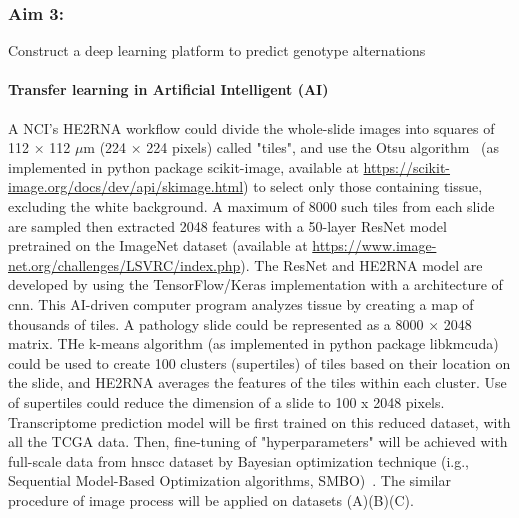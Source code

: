 \documentclass[12pt, a4paper]{article}
\begin{document}
\subsubsection*{Aim 3:} Construct a deep learning platform to predict genotype alternations \\[0.5cm]

\paragraph{Transfer learning in Artificial Intelligent (AI)}

A NCI's HE2RNA workflow could divide the whole-slide images into squares of 112 × 112 $\mu$m (224 × 224 pixels) called "tiles", and use the Otsu algorithm~\citep{Otsu1979} (as implemented in python package scikit-image, available at \url{https://scikit-image.org/docs/dev/api/skimage.html}) to select only those containing tissue, excluding the white background. 
A maximum of 8000 such tiles from each slide are sampled then extracted 2048 features with a 50-layer ResNet model~\citep{He2016a} pretrained on the ImageNet dataset (available at \url{https://www.image-net.org/challenges/LSVRC/index.php}).
The ResNet and HE2RNA model are developed by using the TensorFlow/Keras implementation with a architecture of \acrfull{cnn}.
This AI-driven computer program analyzes tissue by creating a map of thousands of tiles.
A pathology slide could be represented as a 8000 × 2048 matrix.
THe k-means algorithm (as implemented in python package libkmcuda) could be used to create 100 clusters (supertiles) of tiles based on their location on the slide, and HE2RNA averages the features of the tiles within each cluster. 
Use of supertiles could reduce the dimension of a slide to 100 x 2048 pixels.
Transcriptome prediction model will be first trained on this reduced dataset, with all the TCGA data. Then, fine-tuning of "hyperparameters" will be achieved with full-scale data from \acrshort{hnscc} dataset by Bayesian optimization technique (i.g., Sequential Model-Based Optimization algorithms, SMBO)~\citep{Hutter2011}.
The similar procedure of image process will be applied on datasets (A)(B)(C).\\[0.5cm]
\end{document}

